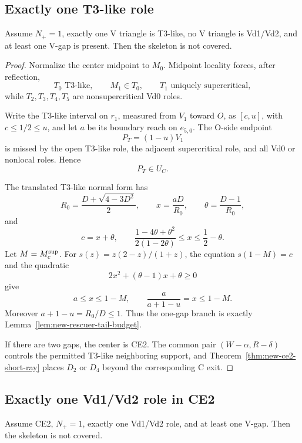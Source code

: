 \subsection{Exactly one T3-like role}

\begin{proposition}
\label{prop:new-one-t3-terminal}
Assume $N_+=1$, exactly one V triangle is T3-like, no V triangle is
Vd1/Vd2, and at least one V-gap is present.  Then the skeleton is not covered.
\end{proposition}



\begin{proof}
Normalize the center midpoint to $M_0$.  Midpoint locality forces, after
reflection,
\[
 T_0\text{ T3-like},\qquad M_1\in T_0,\qquad
 T_1\text{ uniquely supercritical},
\]
while $T_2,T_3,T_4,T_5$ are nonsupercritical Vd0 roles.

Write the T3-like interval on $r_1$, measured from $V_1$ toward $O$, as
$[c,u]$, with $c\le1/2\le u$, and let $a$ be its boundary reach on
$e_{5,0}$.  The O-side endpoint
\[
 P_T=(1-u)V_1
 \tag{6.41}
\]
is missed by the open T3-like role, the adjacent supercritical role, and all
Vd0 or nonlocal roles.  Hence
\[
 \boxed{P_T\in U_C.}
 \tag{6.42}
\]

The translated T3-like normal form has
\[
 R_0=\frac{D+\sqrt{4-3D^2}}2,\qquad
 x=\frac{aD}{R_0},\qquad
 \theta=\frac{D-1}{R_0},
\]
and
\[
 c=x+\theta,\qquad
 \frac{1-4\theta+\theta^2}{2(1-2\theta)}
 \le x\le\frac12-\theta.
 \tag{6.43}
\]
Let $M=M_c^{\rm sup}$.  For
$s(z)=z(2-z)/(1+z)$, the equation $s(1-M)=c$ and the quadratic
\[
 2x^2+(\theta-1)x+\theta\ge0
\]
give
\[
 a\le x\le1-M,
 \qquad
 \frac{a}{a+1-u}=x\le1-M.
 \tag{6.44}
\]
Moreover $a+1-u=R_0/D\le1$.  Thus the one-gap branch is exactly
Lemma~\ref{lem:new-rescuer-tail-budget}.

If there are two gaps, the center is CE2.  The common pair
$(W-\alpha,R-\delta)$ controls the permitted T3-like neighboring support,
and Theorem~\ref{thm:new-ce2-short-ray} places $D_2$ or $D_4$ beyond the
corresponding C exit.
\end{proof}

\subsection{Exactly one Vd1/Vd2 role in CE2}

\begin{proposition}
\label{prop:new-one-vd-assembly}
Assume CE2, $N_+=1$, exactly one Vd1/Vd2 role, and at least one V-gap.  Then
the skeleton is not covered.
\end{proposition}

